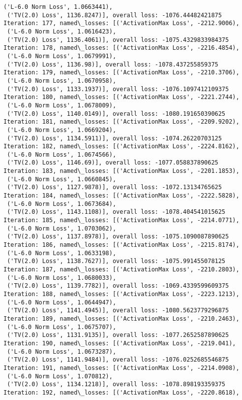 \documentclass[10pt]{article}
\begin{document}
\begin{Verbatim}[commandchars=\\\{\}]
 ('L-6.0 Norm Loss', 1.0663441),
 ('TV(2.0) Loss', 1136.8247)], overall loss: -1076.44482421875
Iteration: 177, named\_losses: [('ActivationMax Loss', -2212.9006),
 ('L-6.0 Norm Loss', 1.0616423),
 ('TV(2.0) Loss', 1136.4061)], overall loss: -1075.4329833984375
Iteration: 178, named\_losses: [('ActivationMax Loss', -2216.4854),
 ('L-6.0 Norm Loss', 1.0679991),
 ('TV(2.0) Loss', 1136.98)], overall loss: -1078.437255859375
Iteration: 179, named\_losses: [('ActivationMax Loss', -2210.3706),
 ('L-6.0 Norm Loss', 1.0670958),
 ('TV(2.0) Loss', 1133.1937)], overall loss: -1076.1097412109375
Iteration: 180, named\_losses: [('ActivationMax Loss', -2221.2744),
 ('L-6.0 Norm Loss', 1.0678009),
 ('TV(2.0) Loss', 1140.0149)], overall loss: -1080.191650390625
Iteration: 181, named\_losses: [('ActivationMax Loss', -2209.9202),
 ('L-6.0 Norm Loss', 1.0669204),
 ('TV(2.0) Loss', 1134.5911)], overall loss: -1074.26220703125
Iteration: 182, named\_losses: [('ActivationMax Loss', -2224.8162),
 ('L-6.0 Norm Loss', 1.0674566),
 ('TV(2.0) Loss', 1146.69)], overall loss: -1077.058837890625
Iteration: 183, named\_losses: [('ActivationMax Loss', -2201.1853),
 ('L-6.0 Norm Loss', 1.0660845),
 ('TV(2.0) Loss', 1127.9878)], overall loss: -1072.13134765625
Iteration: 184, named\_losses: [('ActivationMax Loss', -2222.5828),
 ('L-6.0 Norm Loss', 1.0673684),
 ('TV(2.0) Loss', 1143.1108)], overall loss: -1078.404541015625
Iteration: 185, named\_losses: [('ActivationMax Loss', -2214.0771),
 ('L-6.0 Norm Loss', 1.0703062),
 ('TV(2.0) Loss', 1137.8978)], overall loss: -1075.1090087890625
Iteration: 186, named\_losses: [('ActivationMax Loss', -2215.8174),
 ('L-6.0 Norm Loss', 1.0633198),
 ('TV(2.0) Loss', 1138.7627)], overall loss: -1075.991455078125
Iteration: 187, named\_losses: [('ActivationMax Loss', -2210.2803),
 ('L-6.0 Norm Loss', 1.0680033),
 ('TV(2.0) Loss', 1139.7782)], overall loss: -1069.4339599609375
Iteration: 188, named\_losses: [('ActivationMax Loss', -2223.1213),
 ('L-6.0 Norm Loss', 1.0644947),
 ('TV(2.0) Loss', 1141.4945)], overall loss: -1080.5623779296875
Iteration: 189, named\_losses: [('ActivationMax Loss', -2210.2463),
 ('L-6.0 Norm Loss', 1.0675707),
 ('TV(2.0) Loss', 1131.9135)], overall loss: -1077.2652587890625
Iteration: 190, named\_losses: [('ActivationMax Loss', -2219.041),
 ('L-6.0 Norm Loss', 1.0673287),
 ('TV(2.0) Loss', 1141.9484)], overall loss: -1076.0252685546875
Iteration: 191, named\_losses: [('ActivationMax Loss', -2214.0908),
 ('L-6.0 Norm Loss', 1.070812),
 ('TV(2.0) Loss', 1134.1218)], overall loss: -1078.898193359375
Iteration: 192, named\_losses: [('ActivationMax Loss', -2220.8618),

\end{Verbatim}
\end{document}
